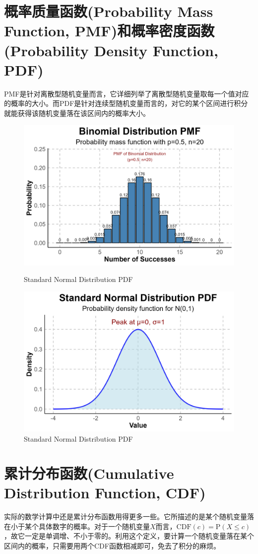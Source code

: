 \documentclass[UTF8]{ctexbook}
\begin{document}
\section{概率质量函数(Probability Mass Function, PMF)和概率密度函数(Probability Density Function, PDF)}
\label{pmf-pdf}
PMF是针对离散型随机变量而言，它详细列举了离散型随机变量取每一个值对应的概率的大小。而PDF是针对连续型随机变量而言的，对它的某个区间进行积分就能获得该随机变量落在该区间内的概率大小。
\begin{figure}[ht]
	\begin{minipage}{0.45\textwidth}
		\centering
		\includegraphics[width=0.8\linewidth]{Figures/BD_PMF.jpg}
		\caption{Standard Normal Distribution PDF}
	\label{fig:Bin_PMF}
	\end{minipage}
	\begin{minipage}{0.45\textwidth}
		\centering
		\includegraphics[width=0.8\linewidth]{Figures/SND_PDF.jpg}
		\caption{Standard Normal Distribution PDF}
	\end{minipage}
\end{figure}

\section{累计分布函数(Cumulative Distribution Function, CDF)}
\label{cdf}
实际的数学计算中还是累计分布函数用得更多一些。它所描述的是某个随机变量落在小于某个具体数字的概率。对于一个随机变量$X$而言，$\mathrm{CDF}(c)=\mathrm{P}(X\leq c)$，故它一定是单调增、不小于零的。利用这个定义，要计算一个随机变量落在某个区间内的概率，只需要用两个CDF函数相减即可，免去了积分的麻烦。
\end{document}
